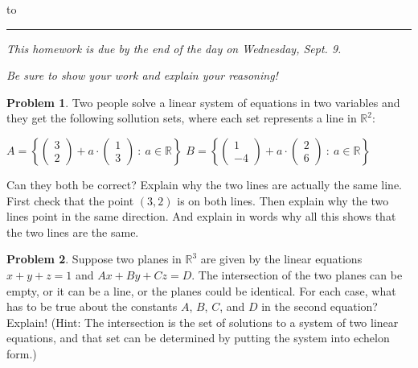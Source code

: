 \documentclass[12pt]{article}
\newcommand{\R}{{\mathbb R}}
\theoremstyle{definition}
\newtheorem{problem}{Problem}
\newenvironment{answer}{\bgroup\color{darkblue}}{\egroup}
\begin{document}
\hbox to 
\nointerlineskip
\vskip 2pt
\hrule height 1pt

\medskip

\centerline{\textit{This homework is due by the end of the day on Wednesday, Sept. 9.}}
\centerline{\textit{Be sure to show your work and explain your reasoning!}}

\medskip

\begin{problem}
Two people solve a linear system of equations in two variables and they get the following sollution sets, where
each set represents a line in $\R^2$:

\medskip

\centerline{
  $A=\left\{ \begin{pmatrix} 3\\2 \end{pmatrix} + a \cdot \begin{pmatrix} 1\\3 \end{pmatrix} \ :\ a\in\R\right\}$
  \qquad
  $B=\left\{ \begin{pmatrix} 1\\-4 \end{pmatrix} + a \cdot \begin{pmatrix} 2\\6 \end{pmatrix} \ :\ a\in\R\right\}$
}

\medskip

\noindent Can they both be correct?  Explain why the two lines are actually the same line.  First check that the point
$(3,2)$ is on both lines.  Then explain why the two lines point in the same direction.  And explain in words why
all this shows that the two lines are the same.
\end{problem}

\begin{answer}
\end{answer}



\begin{problem}
Suppose two planes in $\R^3$ are given by the linear equations $x+y+z=1$ and $Ax+By+Cz=D$.
The intersection of the two planes can be empty, or it can be a line, or the planes could be
identical.  For each case, what has to be true about the constants  $A$, $B$, $C$, and $D$ in 
the second equation? Explain!
(Hint: The intersection is the set of solutions to a system of two linear equations, and
that set can be determined by putting the system into echelon form.)
\end{problem}
\end{document}
